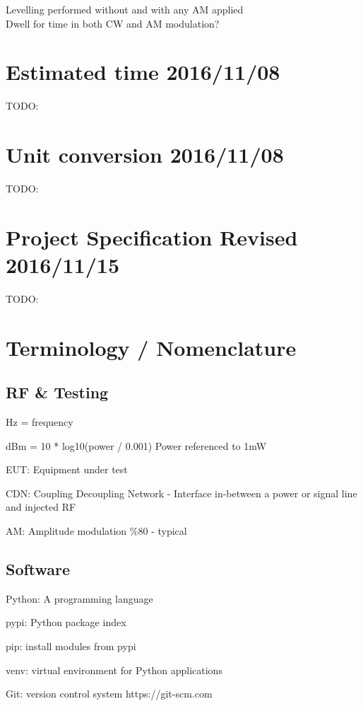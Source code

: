 \documentclass[a4paper]{article}
\begin{document}
Levelling performed without and with any AM applied\\
Dwell for time in both CW and AM modulation?\\

\section{Estimated time 2016/11/08}
TODO:

\section{Unit conversion 2016/11/08}
TODO:

\section{Project Specification Revised 2016/11/15}
TODO:

\newpage

\section{Terminology  /  Nomenclature}
\begin{itemize*}
  \subsection{RF \& Testing}
  \item Hz = frequency
  \item dBm = 10 * log10(power / 0.001) Power referenced to 1mW
  \item EUT: Equipment under test
  \item CDN: Coupling Decoupling Network - Interface in-between a power or signal line and injected RF
  \item AM: Amplitude modulation \%80 - typical
  \end{itemize*}

  \subsection{Software}
  \begin{itemize*}
  \item Python: A programming language
  \item pypi: Python package index
  \item pip: install modules from pypi
  \item venv: virtual environment for Python applications
  \item Git: version control system https://git-scm.com
  \end{itemize*}
\end{document}

